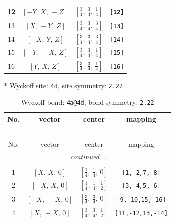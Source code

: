 \documentclass[fleqn,8pt]{jsarticle}
\begin{document}
\begin{longtable}{cccc}
12 & $\left[ - Y,\, X,\, - Z \right]$ & $\left[ \frac{3}{4},\, \frac{3}{4},\, \frac{1}{4} \right]$ & {\tt [12]} \\ \hline
13 & $\left[ X,\, - Y,\, Z \right]$ & $\left[ \frac{3}{4},\, \frac{3}{4},\, \frac{3}{4} \right]$ & {\tt [13]} \\ \hline
14 & $\left[ - X,\, Y,\, Z \right]$ & $\left[ \frac{3}{4},\, \frac{3}{4},\, \frac{3}{4} \right]$ & {\tt [14]} \\ \hline
15 & $\left[ - Y,\, - X,\, Z \right]$ & $\left[ \frac{3}{4},\, \frac{3}{4},\, \frac{1}{4} \right]$ & {\tt [15]} \\ \hline
16 & $\left[ Y,\, X,\, Z \right]$ & $\left[ \frac{3}{4},\, \frac{3}{4},\, \frac{1}{4} \right]$ & {\tt [16]} \\
\end{longtable}
* Wyckoff site: {\tt 4d}, site symmetry: {\tt 2.22}
\renewcommand{\arraystretch}{1.2}
\begin{longtable}{cccc}
\caption{Wyckoff bond: {\tt 4a@4d}, bond symmetry: {\tt 2.22}}
 \\
 \hline \hline
No. & vector & center & mapping \\ \hline \endfirsthead

\multicolumn{3}{l}{\tablename\ \thetable{}} \\
 \hline \hline
No. & vector & center & mapping \\ \hline \endhead

 \hline \hline
\multicolumn{3}{r}{\footnotesize\it continued ...} \\ \endfoot

 \hline \hline
\multicolumn{3}{r}{} \\ \endlastfoot

1 & $\left[ X,\, X,\, 0 \right]$ & $\left[ \frac{1}{4},\, \frac{1}{4},\, 0 \right]$ & {\tt [1,-2,7,-8]} \\ \hline
2 & $\left[ - X,\, X,\, 0 \right]$ & $\left[ \frac{1}{4},\, \frac{1}{4},\, \frac{1}{2} \right]$ & {\tt [3,-4,5,-6]} \\ \hline
3 & $\left[ - X,\, - X,\, 0 \right]$ & $\left[ \frac{3}{4},\, \frac{3}{4},\, 0 \right]$ & {\tt [9,-10,15,-16]} \\ \hline
4 & $\left[ X,\, - X,\, 0 \right]$ & $\left[ \frac{3}{4},\, \frac{3}{4},\, \frac{1}{2} \right]$ & {\tt [11,-12,13,-14]} \\
\end{longtable}
\renewcommand{\arraystretch}{1.2}
\end{document}
